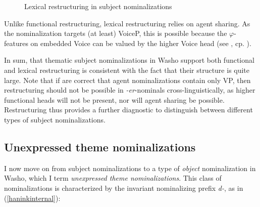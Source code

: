 \documentclass[output=paper]{langscibook}
\begin{document}
\begin{figure}
\caption{Lexical restructuring in subject nominalizations\label{fig:haninksubjectstructure}}
 \end{figure}

Unlike functional restructuring, lexical restructuring relies on agent sharing. As the nominalization targets (at least) VoiceP, this is possible because the $\varphi$-features on embedded Voice can be valued by the higher Voice head (see , cp. ).

In sum, that thematic subject nominalizations in Washo support both functional and lexical restructuring is consistent with the fact that their structure is quite large. Note that if  \citet{bakervinokurova2009} are correct that agent nominalizations contain only VP, then restructuring should not be possible in {\itshape -er}-nominals cross-linguistically, as higher functional heads will not be present, nor will agent sharing be possible. Restructuring thus provides a further diagnostic to distinguish between different types of subject nominalizations.
 

\subsection{Unexpressed theme nominalizations}

I now move on from subject nominalizations to a type of {\itshape object} nominalization in Washo, which I term {\itshape unexpressed theme nominalizations}. This class of nominalizations is characterized by the invariant nominalizing prefix {\itshape d-}, as in (\ref{haninkinternal}): 
\end{document}
